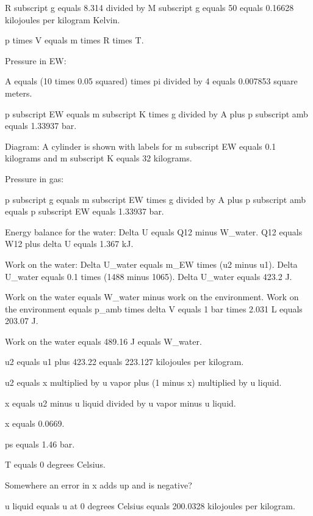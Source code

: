 R subscript g equals 8.314 divided by M subscript g equals 50 equals 0.16628 kilojoules per kilogram Kelvin.  

p times V equals m times R times T.  

Pressure in EW:  

A equals (10 times 0.05 squared) times pi divided by 4 equals 0.007853 square meters.  

p subscript EW equals m subscript K times g divided by A plus p subscript amb equals 1.33937 bar.  

Diagram: A cylinder is shown with labels for m subscript EW equals 0.1 kilograms and m subscript K equals 32 kilograms.  

Pressure in gas:  

p subscript g equals m subscript EW times g divided by A plus p subscript amb equals p subscript EW equals 1.33937 bar.

Energy balance for the water:  
Delta U equals Q12 minus W_water.  
Q12 equals W12 plus delta U equals 1.367 kJ.  

Work on the water:  
Delta U_water equals m_EW times (u2 minus u1).  
Delta U_water equals 0.1 times (1488 minus 1065).  
Delta U_water equals 423.2 J.  

Work on the water equals W_water minus work on the environment.  
Work on the environment equals p_amb times delta V equals 1 bar times 2.031 L equals 203.07 J.  

Work on the water equals 489.16 J equals W_water.

u2 equals u1 plus 423.22 equals 223.127 kilojoules per kilogram.  

u2 equals x multiplied by u vapor plus (1 minus x) multiplied by u liquid.  

x equals u2 minus u liquid divided by u vapor minus u liquid.  

x equals 0.0669.  

ps equals 1.46 bar.  

T equals 0 degrees Celsius.  

Somewhere an error in x adds up and is negative?  

u liquid equals u at 0 degrees Celsius equals 200.0328 kilojoules per kilogram.